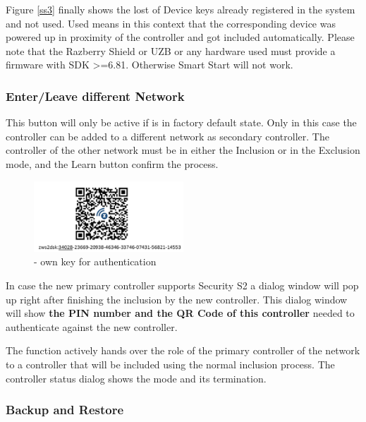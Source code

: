 {Figure \ref{ss3} finally shows the lost of Device keys already registered 
in the system and not used. Used means in this context that the corresponding device
was powered up in proximity of the controller and got included automatically. Please note that
the Razberry Shield or UZB or any hardware used must provide a firmware with SDK >=6.81. 
Otherwise Smart Start will not work.



\subsubsection{Enter/Leave different Network}


This button will only be active if \zway is in factory default state. Only in this case 
the controller can be added to a different network as secondary controller. The controller 
of the other network must be in either the Inclusion or in the Exclusion mode, and the 
Learn button confirm the process.


\begin{figure}
\begin{center}
\includegraphics[width=0.5\textwidth]{pngs/cap7/security2_5.png}
\caption{\zway -  own key for authentication}
\label{security2_5}
\end{center}
\end{figure}

In case the new primary controller supports Security S2 a dialog window 
will pop up right after finishing the inclusion by the new controller. This dialog window 
will show \textbf{the PIN number and the QR Code of this \zway controller} needed to authenticate 
against the new controller.


The  function actively hands over the role of the primary controller 
of the network to a controller that will be included using the normal inclusion process. 
The controller status dialog shows the mode and its termination.


\subsubsection{Backup and Restore}
\label{BackupandRestore}

}

